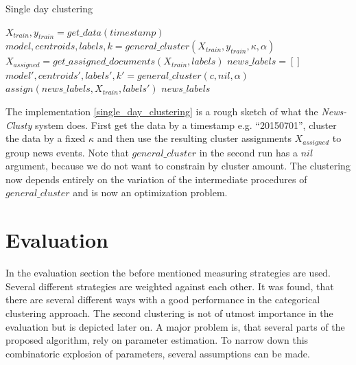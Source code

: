   \begin{algorithm}[H]
  \begin{algorithmic}[1]
    \caption{Single day clustering}\label{single_day_clustering}
      \State $X_{train},y_{train} = get\_data(timestamp)$
      \State $model,centroids,labels,k = general\_cluster(X_{train},y_{train},\kappa,\alpha)$
      \State $X_{assigned} = get\_assigned\_documents(X_{train},labels)$
      \State $news\_labels = []$
        \State $model',centroids',labels',k' = general\_cluster(c,nil,\alpha)$
        \State $assign(news\_labels, X_{train}, labels')$
      \EndFor
      \State \Return $news\_labels$
  \end{algorithmic}
  \end{algorithm}

The implementation \ref{single_day_clustering} is a rough sketch of what the \emph{News-Clusty} system does. First get the data by a timestamp e.g. ``20150701'', cluster the data by a fixed $\kappa$ and then use the resulting cluster assignments $X_{assigned}$ to group news events. Note that $general\_cluster$ in the second run has a $nil$ argument, because we do not want to constrain by cluster amount. The clustering now depends entirely on the variation of the intermediate procedures of $general\_cluster$ and is now an optimization problem. 

\section{Evaluation}
In the evaluation section the before mentioned measuring strategies are used. Several different strategies are weighted against each other. It was found, that there are several different ways with a good performance in the categorical clustering approach. The second clustering is not of utmost importance in the evaluation but is depicted later on. A major problem is, that several parts of the proposed algorithm, rely on parameter estimation. To narrow down this combinatoric explosion of parameters, several assumptions can be made.

